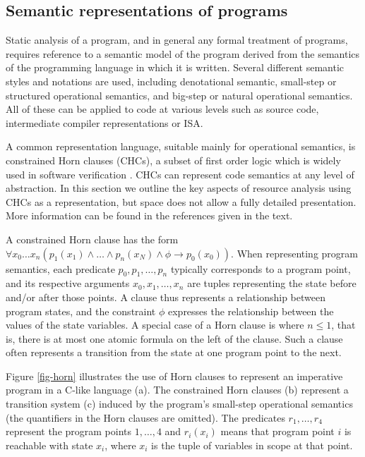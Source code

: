 \documentclass[oneside]{book}
\begin{document}
\subsection{Semantic representations of programs}
Static analysis of a program, and in general any formal treatment of programs, requires reference 
to a semantic model of the program derived from the semantics of the
programming language in which it is written. Several different semantic styles
and notations are used, including denotational semantic, small-step or structured
operational semantics, and big-step or natural operational semantics.
All of these can be applied to code
 at various levels such as source code, intermediate compiler
representations or ISA.

A common representation language, suitable mainly for operational semantics, is
constrained Horn clauses (CHCs), a subset of first order logic which is
widely used in software verification
\cite{DBLP:conf/birthday/BjornerGMR15}. CHCs can represent code semantics at any
level of abstraction. In this section we outline the key aspects of
resource analysis using CHCs as a representation, but space does not
allow a fully detailed presentation.  More information can be found in the
references given in the text.

A constrained Horn clause has the form $\forall x_0 \ldots x_n 
(p_1(x_1) \wedge \ldots \wedge p_n(x_N) \wedge \phi \rightarrow
p_0(x_0))$. When representing program semantics, each predicate
$p_0,p_1,\ldots,p_n$ typically corresponds to a program point, and its
respective arguments $x_0,x_1,\ldots,x_n$ are tuples representing the
state before and/or after those points.  A clause thus represents a
relationship between program states, and the constraint $\phi$ expresses
the relationship between the values of the state variables. A special case
of a Horn clause is where $n \le 1$, that is, there is at most one atomic
formula on the left of the clause.  Such a clause often represents a transition 
from the state at one program point to the next.

Figure \ref{fig-horn} illustrates the use of Horn clauses to 
represent an imperative program in a C-like language (a).
The constrained Horn clauses (b) represent a transition
system (c) induced by the program's small-step operational 
semantics (the quantifiers in
the Horn clauses are
omitted).  The predicates
$r_1, \ldots, r_4$ represent the program points $1,\ldots,4$ and
$r_i(x_i)$ means that program point $i$  is reachable with state
$x_i$, where $x_i$ is the tuple of variables in scope at that point.
\end{document}
